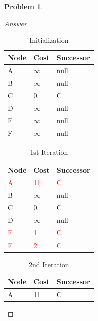 \documentclass[11pt]{article}
\theoremstyle{definition}
\theoremstyle{definition}
\newtheorem{required}{Problem}
\theoremstyle{definition}
\begin{document}
\begin{required}
\begin{proof}[Answer]
\begin{table}[htp]
\centering
\caption{Initialization}
\begin{tabular}{|l|l|l|} 
\hline
\rowcolor[rgb]{0.753,0.753,0.753} Node & Cost     & Successor  \\ 
\hline
A                                      & $\infty$ & null       \\ 
\hline
B                                      & $\infty$ & null       \\ 
\hline
C                                      & 0        & C          \\ 
\hline
D                                      & $\infty$ & null       \\ 
\hline
E                                      & $\infty$ & null       \\ 
\hline
F                                      & $\infty$ & null       \\
\hline
\end{tabular}
\end{table}
\begin{table}[htp]
\centering
\caption{1st Iteration}
\begin{tabular}{|l|l|l|} 
\hline
\rowcolor[rgb]{0.753,0.753,0.753} Node & Cost                & Successor           \\ 
\hline
\textcolor{red}{A}                     & \textcolor{red}{11} & \textcolor{red}{C}  \\ 
\hline
B                                      & $\infty$            & null                \\ 
\hline
C                                      & 0                   & C                   \\ 
\hline
D                                      & $\infty$            & null                \\ 
\hline
\textcolor{red}{E}                     & \textcolor{red}{1}  & \textcolor{red}{C}  \\ 
\hline
\textcolor{red}{F}                     & \textcolor{red}{2}  & \textcolor{red}{C}  \\
\hline
\end{tabular}
\end{table}
\begin{table}[htp]
\centering
\caption{2nd Iteration}
\begin{tabular}{|l|l|l|} 
\hline
\rowcolor[rgb]{0.753,0.753,0.753} Node & Cost               & Successor           \\ 
\hline
A                                      & 11                 & C                   \\ 

\end{tabular}
\end{table}
\end{proof}
\end{required}
\end{document}
